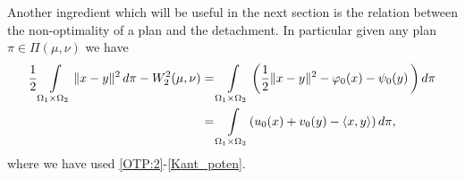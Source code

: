\documentclass[reqno,12pt]{article}
\newcommand{\inner}[2]{\left\langle #1, #2 \right\rangle}
\newcommand{\I}{\int\limits}
\begin{document}
Another ingredient  which will be useful in the next section is the relation between the non-optimality of a plan and the detachment. In particular given any plan $\pi \in \Pi(\mu, \nu)$ we have
\begin{align} \frac 12 \I_{\Omega_1 \times \Omega_2} \|x-y\|^2 \,d\pi - W_2^2(\mu, \nu) &=  \I_{\Omega_1 \times \Omega_2} \left(\frac 12 \|x-y\|^2 - \varphi_0(x) - \psi_0(y) \,\right) d \pi \notag\\
& \label{eqn:detachment} = \I_{\Omega_1 \times \Omega_2} (u_0(x)+v_0(y) - \langle x, y \rangle ) \, d \pi,
\end{align}
where we have used \eqref{OTP:2}-\eqref{Kant_poten}.





\end{document}

